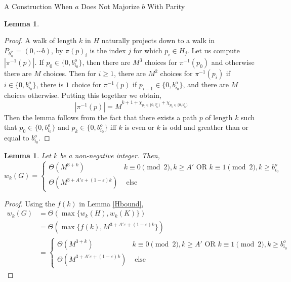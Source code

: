 \documentclass[11pt,a4paper]{article}
\newtheorem{lemma}[subsection]{Lemma}
\newcommand{\vep}{\varepsilon}
\begin{document}
\begin{section}{A Construction When $a$ Does Not Majorize $b$ With Parity}
\begin{lemma}
\end{lemma}
\begin{proof}
A walk of length $k$ in $H$ naturally projects down to a walk in $P_{b^o_{i_0}} = (0, \cdots b)$, by $\pi(p)_i$ is the index $j$ for which $p_i \in H_j$. Let us compute $|\pi^{-1}(p)|$. If $p_0 \in \{0, b^o_{i_0} \}$, then there are $M^3$ choices for $\pi^{-1}(p_0)$ and otherwise there are $M$ choices. Then for $i \geq 1$, there are $M^2$ choices for $\pi^{-1}(p_i)$ if $i \in \{0, b^o_{i_0}\}$, there is $1$ choice for $\pi^{-1}(p)$ if $p_{i - 1} \in \{0, b^o_{i_0}\}$, and there are $M$ choices otherwise. Putting this together we obtain, 
\[
|\pi^{-1} (p) | = M^{ k + 1 + \chi_{p_0  \in \{0, b^o_{i_0}\} } + \chi_{p_k \in \{0, b^o_{i_0}\} } }
\]  
Then the lemma follows from the fact that there exists a path $p$ of length $k$ such that $p_{0} \in \{0, b^o_{i_0} \}$ and $p_{k} \in \{ 0, b^o_{i_0} \}$ iff $k$ is even or $k$ is odd and greather than or equal to $b^o_{i_0}$.
\end{proof}


\begin{lemma} \label{weight_bound} Let $k$ be a non-negative integer. Then,
\[
w_k(G) = \begin{cases} \Theta(M^{3 + k} )  & k \equiv 0 \pmod 2,  k \geq A' \text{ OR }  k \equiv 1 \pmod 2,  k \geq b^o_{i_0} \\   
\Theta(M^{3 + A' \vep + (1 - \vep) k } )  &   \text{ else } 
\end{cases}
\]
\end{lemma}
\begin{proof} Using the $f(k)$ in Lemma \ref{Hbound},
\begin{align*}
w_k(G) & = \Theta ( \max \{ w_k(H), w_k(K) \} )\\
 & = \Theta ( \max \{  f(k),  M^{3 + A' \vep + (1 - \vep) k } \} )\\
& =  \begin{cases} \Theta(M^{3 + k} )  & k \equiv 0 \pmod 2,  k \geq A' \text{ OR }  k \equiv 1 \pmod 2,  k \geq b^o_{i_0} \\   
\Theta(M^{3 + A' \vep + (1 - \vep) k } )  &   \text{ else } 
\end{cases}
\end{align*}


\end{proof}
\end{section}
\end{document}
